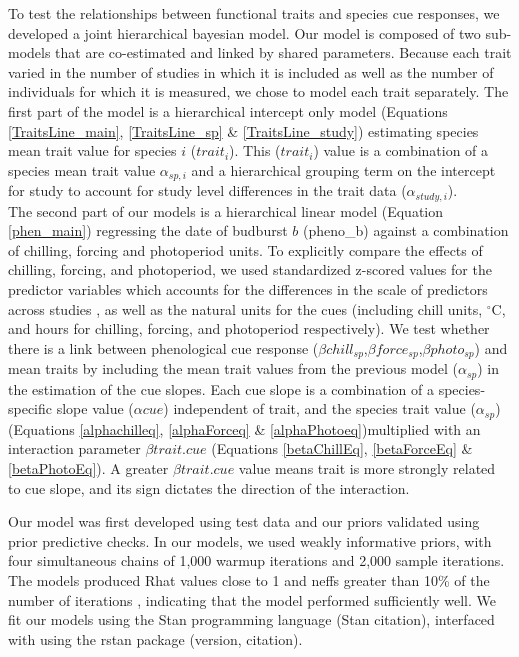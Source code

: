 \documentclass{article}\usepackage[]{graphicx}\usepackage[]{color}
\begin{document}
To test the relationships between functional traits and species cue responses, we developed a joint hierarchical bayesian model. Our model is composed of two sub-models that are co-estimated and linked by shared parameters. Because each trait varied in the number of studies in which it is included as well as the number of individuals for which it is measured, we chose to model each trait separately. The first part of the model is a hierarchical intercept only model (Equations \ref{TraitsLine_main}, \ref{TraitsLine_sp} & \ref{TraitsLine_study}) estimating species mean trait value for species $i$ ($trait_{i}$). This ($trait_{i}$) value is a combination of a species mean trait value $\alpha_{sp,i}$ and a hierarchical grouping term on the intercept for study to account for study level differences in the trait data ($\alpha_{study,i}$).  \\

The second part of our models is a hierarchical linear model (Equation \ref{phen_main}) regressing the date of budburst $b$ (pheno_{b}) against a combination of chilling, forcing and photoperiod units. To explicitly compare the effects of chilling, forcing, and photoperiod, we used standardized z-scored values for the predictor variables which accounts for the differences in the scale of predictors across studies \citep{Gelman2006}, as well as the natural units for the cues (including chill units, $^\circ$C, and hours for chilling, forcing, and photoperiod respectively). We test whether there is a link between phenological cue response ($\beta chill_{sp}$,$\beta force_{sp}$,$\beta photo_{sp}$) and mean traits by including the mean trait values from the previous model ($\alpha_{sp}$) in the estimation of the cue slopes. Each cue slope is a combination of a species-specific slope value ($\alpha cue$) independent of trait, and the species trait value ($\alpha_{sp}$) (Equations \ref{alphachilleq}, \ref{alphaForceq} & \ref{alphaPhotoeq})multiplied with an interaction parameter $\beta trait.cue$ (Equations \ref{betaChillEq}, \ref{betaForceEq} & \ref{betaPhotoEq}). A greater $\beta trait.cue$ value means trait is more strongly related to cue slope, and its sign dictates the direction of the interaction. 

Our model was first developed using test data and our priors validated using prior predictive checks. In our models, we used weakly informative priors, with four simultaneous chains of 1,000 warmup iterations and 2,000 sample iterations. The models produced Rhat values close to 1 and neffs greater than 10\% of the number of iterations %
, indicating that the model performed sufficiently well.  We fit our models using the Stan programming language (Stan citation), interfaced with using the rstan package (version, citation).
\end{document}
